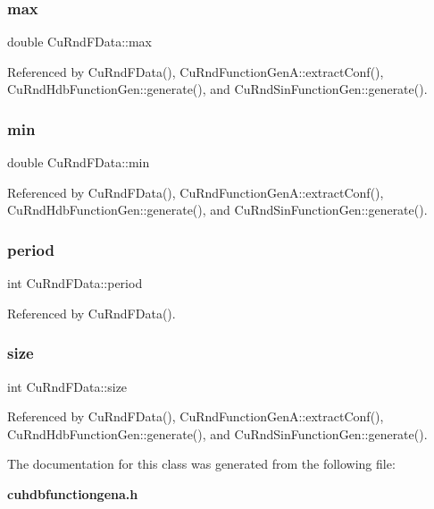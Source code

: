 \subsubsection{max}
{\footnotesize\ttfamily double Cu\+Rnd\+F\+Data\+::max}



Referenced by Cu\+Rnd\+F\+Data(), Cu\+Rnd\+Function\+Gen\+A\+::extract\+Conf(), Cu\+Rnd\+Hdb\+Function\+Gen\+::generate(), and Cu\+Rnd\+Sin\+Function\+Gen\+::generate().

\mbox{\label{classCuRndFData_a3d8a4fa08985649b858a7d97e969b3c5}} 
\subsubsection{min}
{\footnotesize\ttfamily double Cu\+Rnd\+F\+Data\+::min}



Referenced by Cu\+Rnd\+F\+Data(), Cu\+Rnd\+Function\+Gen\+A\+::extract\+Conf(), Cu\+Rnd\+Hdb\+Function\+Gen\+::generate(), and Cu\+Rnd\+Sin\+Function\+Gen\+::generate().

\mbox{\label{classCuRndFData_a65e156c528ea03a3aca302bd628e1c66}} 
\subsubsection{period}
{\footnotesize\ttfamily int Cu\+Rnd\+F\+Data\+::period}



Referenced by Cu\+Rnd\+F\+Data().

\mbox{\label{classCuRndFData_ac7c04b919b7e03b8bf371d0f6837a745}} 
\subsubsection{size}
{\footnotesize\ttfamily int Cu\+Rnd\+F\+Data\+::size}



Referenced by Cu\+Rnd\+F\+Data(), Cu\+Rnd\+Function\+Gen\+A\+::extract\+Conf(), Cu\+Rnd\+Hdb\+Function\+Gen\+::generate(), and Cu\+Rnd\+Sin\+Function\+Gen\+::generate().



The documentation for this class was generated from the following file\+:\begin{DoxyCompactItemize}
\item 
\textbf{ cuhdbfunctiongena.\+h}\end{DoxyCompactItemize}
